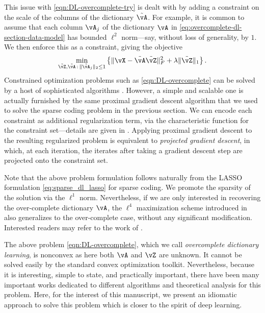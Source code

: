 \documentclass[../../book-main.tex]{subfiles}
\begin{document}
This issue with \eqref{eqn:DL-overcomplete-try} is dealt with by adding
a constraint on the scale of the columns of the dictionary $\tilde{\vA}$.
For example, it is common to assume that each column $\vA_j$ of the dictionary
$\vA$ in \eqref{eq:overcomplete-dl-section-data-model} has bounded $\ell^2$
norm---say, without loss of generality, by $1$.
We then enforce this as a constraint, giving the objective
\begin{equation}
    \min_{\tilde{\vZ}, \tilde{\vA} \,:\, \norm{\tilde{\vA}_j}_2 \leq 1}
    \bc{\norm{\vX - \tilde{\vA}\tilde{\vZ}}_{F}^{2} + \lambda \norm{\tilde{\vZ}}_{1}}.
    \label{eqn:DL-overcomplete}
\end{equation}
Constrained optimization problems such as \eqref{eqn:DL-overcomplete}
can be solved by a host of sophisticated algorithms
\cite{nocedal2006numerical}. However, a simple and scalable one is actually
furnished by the same proximal gradient descent algorithm that we used to solve
the sparse coding problem in the previous section.
We can encode each constraint as additional regularization term, via the
characteristic function for the constraint set---details are given in
.
Applying proximal gradient descent to the resulting regularized problem is
equivalent to \textit{projected gradient descent}, in which, at each iteration,
the iterates after taking a gradient descent step are projected onto the
constraint set.

\begin{remark}
Note that the above problem formulation follows naturally from the LASSO
    formulation \eqref{eq:sparse_dl_lasso} for sparse coding. We promote the
    sparsity of the solution via the \(\ell^1\) norm. Nevertheless, if we are only interested in recovering the over-complete dictionary \(\vA\), the \(\ell^4\) maximization scheme introduced in  also generalizes to the over-complete case, without any significant modification. Interested readers may refer to the work of \cite{Qu2020Geometric}. 
\end{remark}

The above problem \eqref{eqn:DL-overcomplete}, which we call
\textit{overcomplete dictionary learning}, is nonconvex as here both \(\vA\) and
\(\vZ\) are unknown. It cannot be solved easily by the standard convex
optimization toolkit. Nevertheless, because it is interesting, simple to state,
and practically important, there have been many important works dedicated to
different algorithms and theoretical analysis for this problem. Here, for the
interest of this manuscript, we present an idiomatic approach to solve this problem
which is closer to the spirit of deep learning.
\end{document}
